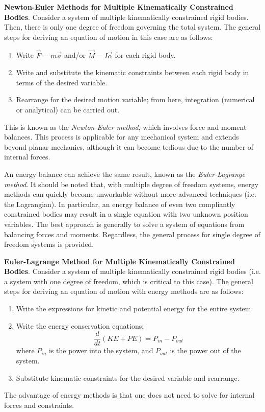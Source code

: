 \begin{framed}
\textbf{Newton-Euler Methods for Multiple Kinematically Constrained Bodies}. Consider a system of multiple kinematically constrained rigid bodies. Then, there is only one degree of freedom governing the total system. The general steps for deriving an equation of motion in this case are as follows: \begin{enumerate}
    \item[1.] Write $\vec{F}=m\vec{a}$ and/or $\vec{M}=I\vec{\alpha}$ for each rigid body.
    \item[2.] Write and substitute the kinematic constraints between each rigid body in terms of the desired variable.
    \item[3.] Rearrange for the desired motion variable; from here, integration (numerical or analytical) can be carried out.
\end{enumerate} This is known as the \textit{Newton-Euler method}, which involves force and moment balances. This process is applicable for any mechanical system and extends beyond planar mechanics, although it can become tedious due to the number of internal forces.
\end{framed}



An energy balance can achieve the same result, known as the \textit{Euler-Lagrange method}. It should be noted that, with multiple degree of freedom systems, energy methods can quickly become unworkable without more advanced techniques (i.e. the Lagrangian). In particular, an energy balance of even two compliantly constrained bodies may result in a single equation with two unknown position variables. The best approach is generally to solve a system of equations from balancing forces and moments. Regardless, the general process for single degree of freedom systems is provided.

\begin{framed}
\textbf{Euler-Lagrange Method for Multiple Kinematically Constrained Bodies}. Consider a system of multiple kinematically constrained rigid bodies (i.e. a system with one degree of freedom, which is critical to this case). The general steps for deriving an equation of motion with energy methods are as follows: \vspace{-1em}\begin{enumerate}
    \item[1.] Write the expressions for kinetic and potential energy for the entire system.
    \item[2.] Write the energy conservation equations: \[\frac{d}{dt} (KE + PE) = P_{in}-P_{out}\] where $P_{in}$ is the power into the system, and $P_{out}$ is the power out of the system.
    \item[3.] Substitute kinematic constraints for the desired variable and rearrange.
\end{enumerate}\vspace{-1em} The advantage of energy methods is that one does not need to solve for internal forces and constraints.
\end{framed}

